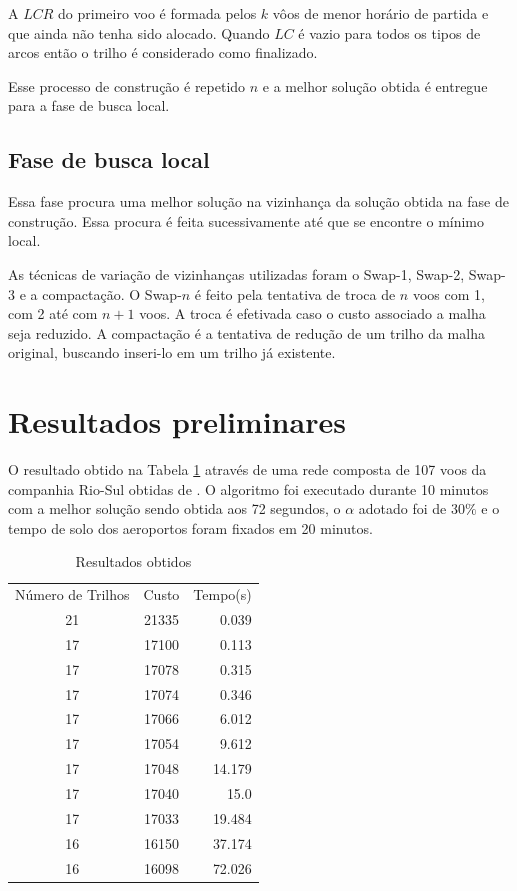 \documentclass[12pt]{article}
\begin{document}
A $LCR$ do primeiro voo é formada pelos $k$ vôos de menor horário de partida e
que ainda não tenha sido alocado. Quando $LC$ é vazio para todos os tipos de arcos
então o trilho é considerado como finalizado.

Esse processo de construção é repetido  $n$ e a melhor solução obtida é entregue
para a fase de busca local.
  
\subsection{Fase de busca local}

Essa fase procura uma melhor solução na vizinhança da solução obtida na fase de construção. 
Essa procura é feita sucessivamente até que se encontre o mínimo local. 

As técnicas de variação de vizinhanças utilizadas foram o Swap-1, Swap-2, Swap-3 e a compactação. O Swap-$n$ é feito pela tentativa de troca de $n$ voos com 1, com 2 até com $n + 1$ voos. A troca é efetivada caso o custo associado a malha seja reduzido. A compactação é a tentativa de redução de um trilho da malha original, buscando inseri-lo em um trilho já existente.

\section{Resultados preliminares}

O resultado obtido na Tabela \ref{tab:resultados} através de uma rede composta de 107 voos  da companhia Rio-Sul obtidas de \cite{pontes2002}. 
O algoritmo foi executado durante 10 minutos com a melhor solução sendo obtida aos 72 segundos, 
o $\alpha$ adotado foi de 30$\%$ e o tempo de solo dos aeroportos foram fixados em 20 minutos.

\begin{table}[ht]
\centering

\begin{tabular}{|ccr|}

Número de Trilhos & Custo & Tempo(s) \\
21 & 21335 & 0.039 \\
17 & 17100 & 0.113 \\
17 & 17078 & 0.315 \\
17 & 17074 & 0.346 \\
17 & 17066 & 6.012 \\
17 & 17054 & 9.612 \\
17 & 17048 & 14.179 \\
17 & 17040 & 15.0 \\
17 & 17033 & 19.484 \\
16 & 16150 & 37.174 \\
16 & 16098 & 72.026 \\

\end{tabular}
\caption{Resultados obtidos}
\label{tab:resultados}
\end{table}
\end{document}
